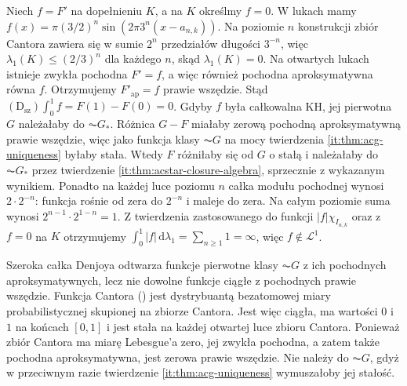 \begin{przyklad}
Niech $f=F'$ na dopełnieniu $K$, a na $K$ określmy $f=0$. W lukach mamy
$f(x)=\pi(3/2)^n\sin(2\pi3^n(x-a_{n,k}))$.
Na poziomie $n$ konstrukcji zbiór Cantora zawiera się
w sumie $2^n$ przedziałów długości $3^{-n}$, więc
$\lambda_1(K)\le(2/3)^n$ dla każdego $n$, skąd
$\lambda_1(K)=0$. Na otwartych lukach istnieje zwykła
pochodna $F'=f$, a więc również pochodna aproksymatywna
równa $f$. Otrzymujemy $F'_{\mathrm{ap}}=f$ prawie wszędzie. Stąd $(\mathrm D_{\mathrm{sz}})\int_0^1 f=F(1)-F(0)=0$. Gdyby $f$ była całkowalna KH, jej pierwotna $G$ należałaby do $\AC G_*$. Różnica $G-F$ miałaby zerową pochodną aproksymatywną prawie wszędzie, więc jako funkcja klasy $\AC G$ na mocy twierdzenia \ref{it:thm:acg-uniqueness} byłaby stała. Wtedy $F$ różniłaby się od $G$ o stałą i należałaby do $\AC G_*$ przez twierdzenie \ref{it:thm:acstar-closure-algebra}, sprzecznie z wykazanym wynikiem. Ponadto na każdej luce poziomu $n$ całka modułu pochodnej wynosi $2\cdot2^{-n}$: funkcja rośnie od zera do $2^{-n}$ i maleje do zera. Na całym poziomie suma wynosi $2^{n-1}\cdot2^{1-n}=1$. Z twierdzenia  zastosowanego do funkcji $|f|\chi_{I_{n,k}}$ oraz z $f=0$ na $K$ otrzymujemy $\int_0^1|f|\,\mathrm d\lambda_1=\sum_{n\ge1}1=\infty$, więc $f\notin\mathcal L^1$.
\end{przyklad}
\begin{uwaga}
Szeroka całka Denjoya odtwarza funkcje pierwotne klasy $\AC G$ z ich pochodnych aproksymatywnych, lecz nie dowolne funkcje ciągłe z pochodnych prawie wszędzie. Funkcja Cantora ()
jest dystrybuantą bezatomowej miary probabilistycznej
skupionej na zbiorze Cantora. Jest więc ciągła,
ma wartości $0$ i $1$ na końcach $[0,1]$ i jest
stała na każdej otwartej luce zbioru Cantora.
Ponieważ zbiór Cantora ma miarę Lebesgue'a zero,
jej zwykła pochodna, a zatem także pochodna
aproksymatywna, jest zerowa prawie wszędzie.
Nie należy do $\AC G$, gdyż w przeciwnym razie
twierdzenie \ref{it:thm:acg-uniqueness} wymuszałoby
jej stałość.
\end{uwaga}

